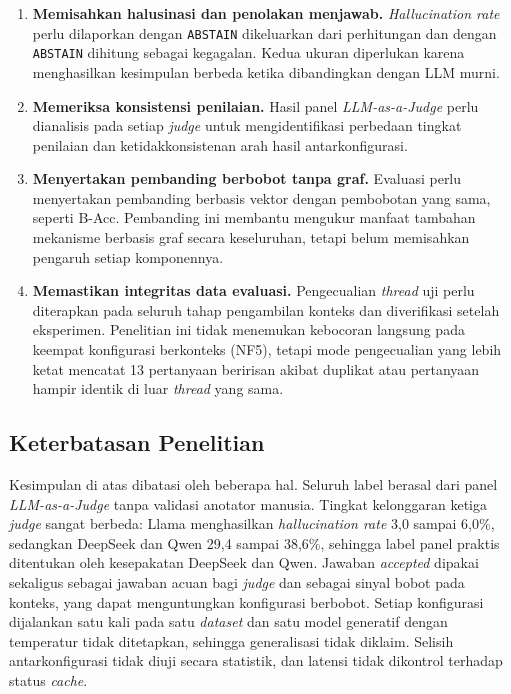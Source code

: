 \begin{enumerate}
    \item \textbf{Memisahkan halusinasi dan penolakan menjawab.} \emph{Hallucination rate} perlu dilaporkan dengan \texttt{ABSTAIN} dikeluarkan dari perhitungan dan dengan \texttt{ABSTAIN} dihitung sebagai kegagalan. Kedua ukuran diperlukan karena menghasilkan kesimpulan berbeda ketika dibandingkan dengan LLM murni.

    \item \textbf{Memeriksa konsistensi penilaian.} Hasil panel \emph{LLM-as-a-Judge} perlu dianalisis pada setiap \emph{judge} untuk mengidentifikasi perbedaan tingkat penilaian dan ketidakkonsistenan arah hasil antarkonfigurasi.

    \item \textbf{Menyertakan pembanding berbobot tanpa graf.} Evaluasi perlu menyertakan pembanding berbasis vektor dengan pembobotan yang sama, seperti B-Acc. Pembanding ini membantu mengukur manfaat tambahan mekanisme berbasis graf secara keseluruhan, tetapi belum memisahkan pengaruh setiap komponennya.

    \item \textbf{Memastikan integritas data evaluasi.} Pengecualian \emph{thread} uji perlu diterapkan pada seluruh tahap pengambilan konteks dan diverifikasi setelah eksperimen. Penelitian ini tidak menemukan kebocoran langsung pada keempat konfigurasi berkonteks (NF5), tetapi mode pengecualian yang lebih ketat mencatat 13 pertanyaan beririsan akibat duplikat atau pertanyaan hampir identik di luar \emph{thread} yang sama.
\end{enumerate}

\subsection{Keterbatasan Penelitian}
\label{subsec:keterbatasan-penelitian}

Kesimpulan di atas dibatasi oleh beberapa hal. Seluruh label berasal dari panel \emph{LLM-as-a-Judge} tanpa validasi anotator manusia. Tingkat kelonggaran ketiga \emph{judge} sangat berbeda: Llama menghasilkan \emph{hallucination rate} 3,0 sampai 6,0\%, sedangkan DeepSeek dan Qwen 29,4 sampai 38,6\%, sehingga label panel praktis ditentukan oleh kesepakatan DeepSeek dan Qwen. Jawaban \emph{accepted} dipakai sekaligus sebagai jawaban acuan bagi \emph{judge} dan sebagai sinyal bobot pada konteks, yang dapat menguntungkan konfigurasi berbobot. Setiap konfigurasi dijalankan satu kali pada satu \emph{dataset} dan satu model generatif dengan temperatur tidak ditetapkan, sehingga generalisasi tidak diklaim. Selisih antarkonfigurasi tidak diuji secara statistik, dan latensi tidak dikontrol terhadap status \emph{cache}.


